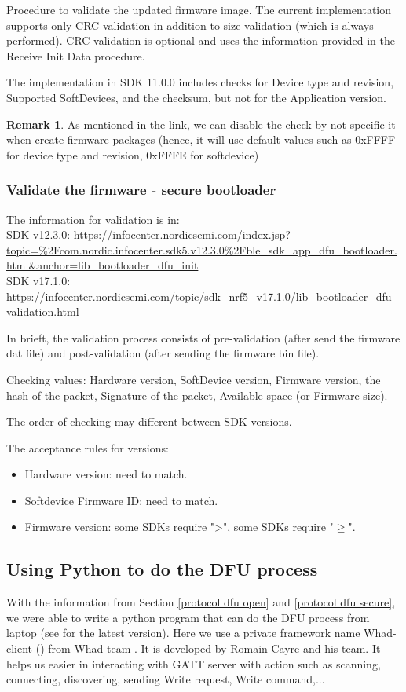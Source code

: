 \documentclass{article}
\theoremstyle{plain}
\theoremstyle{definition}
\newtheorem{remark}{Remark}
\numberwithin{equation}{section}
\begin{document}
Procedure to validate the updated firmware image. The current implementation supports only CRC validation in addition to size validation (which is always performed). CRC validation is optional and uses the information provided in the Receive Init Data procedure.

The  implementation in SDK 11.0.0 includes checks for Device type and revision, Supported SoftDevices, and the checksum, but not for the Application version.

\begin{remark}\label{check open}
	As mentioned in the link, we can disable the check by not specific it when create firmware packages (hence, it will use default values such as  0xFFFF for device type and revision, 0xFFFE for softdevice)
\end{remark}
\subsubsection{Validate the firmware - secure bootloader} \label{sec check secure}
The information for validation is in:\\
SDK v12.3.0:  \url{https://infocenter.nordicsemi.com/index.jsp?topic=%2Fcom.nordic.infocenter.sdk5.v12.3.0%2Fble_sdk_app_dfu_bootloader.html&anchor=lib_bootloader_dfu_init}\\
SDK v17.1.0: \url{https://infocenter.nordicsemi.com/topic/sdk_nrf5_v17.1.0/lib_bootloader_dfu_validation.html}

In brieft, the validation process consists of pre-validation (after send the firmware dat file) and post-validation (after sending the firmware bin file).

Checking values: Hardware version, SoftDevice version, Firmware version, the hash of the packet, Signature of the packet, Available space (or Firmware size).


The order of checking may different between SDK versions.


The acceptance rules for versions:
\begin{itemize}
	\item Hardware version: need to match.
	\item Softdevice Firmware ID: need to match.
	\item Firmware version: some SDKs require ">", some SDKs require "$ \geq $".
\end{itemize}

\subsection{Using Python to do the DFU process}\label{python application}
With the information from Section \ref{protocol dfu open} and \ref{protocol dfu secure}, we were able to write a python program that can do the DFU process from laptop (see \cite[folder ]{gitlab}  for the latest version). Here we use a private framework name Whad-client (\cite{whad}) from Whad-team . It is developed by Romain Cayre and his team. It helps us easier in interacting with GATT server with action such as scanning, connecting, discovering, sending Write request, Write command,...
\end{document}

